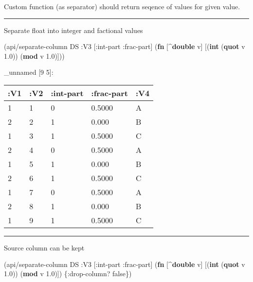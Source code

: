 \documentclass[]{article}
\newenvironment{Shaded}{\begin{snugshade}}{\end{snugshade}}
\newcommand{\KeywordTok}[1]{\textcolor[rgb]{0.13,0.29,0.53}{\textbf{#1}}}
\newcommand{\FloatTok}[1]{\textcolor[rgb]{0.00,0.00,0.81}{#1}}
\newcommand{\VariableTok}[1]{\textcolor[rgb]{0.00,0.00,0.00}{#1}}
\newcommand{\AttributeTok}[1]{\textcolor[rgb]{0.77,0.63,0.00}{#1}}
\newcommand{\NormalTok}[1]{#1}
\begin{document}
Custom function (as separator) should return seqence of values for given
value.

\begin{center}\rule{0.5\linewidth}{0.5pt}\end{center}

Separate float into integer and factional values

\begin{Shaded}
\begin{Highlighting}[]
\NormalTok{(api/separate-column DS }\AttributeTok{:V3}\NormalTok{ [}\AttributeTok{:int-part} \AttributeTok{:frac-part}\NormalTok{] (}\KeywordTok{fn}\NormalTok{ [^}\KeywordTok{double}\NormalTok{ v]}
\NormalTok{                                                     [(}\KeywordTok{int}\NormalTok{ (}\KeywordTok{quot}\NormalTok{ v }\FloatTok{1.0}\NormalTok{))}
\NormalTok{                                                      (}\KeywordTok{mod}\NormalTok{ v }\FloatTok{1.0}\NormalTok{)]))}
\end{Highlighting}
\end{Shaded}

\_unnamed {[}9 5{]}:

\begin{longtable}[]{@{}lllll@{}}
\toprule
:V1 & :V2 & :int-part & :frac-part & :V4\tabularnewline
\midrule
\endhead
1 & 1 & 0 & 0.5000 & A\tabularnewline
2 & 2 & 1 & 0.000 & B\tabularnewline
1 & 3 & 1 & 0.5000 & C\tabularnewline
2 & 4 & 0 & 0.5000 & A\tabularnewline
1 & 5 & 1 & 0.000 & B\tabularnewline
2 & 6 & 1 & 0.5000 & C\tabularnewline
1 & 7 & 0 & 0.5000 & A\tabularnewline
2 & 8 & 1 & 0.000 & B\tabularnewline
1 & 9 & 1 & 0.5000 & C\tabularnewline
\bottomrule
\end{longtable}

\begin{center}\rule{0.5\linewidth}{0.5pt}\end{center}

Source column can be kept

\begin{Shaded}
\begin{Highlighting}[]
\NormalTok{(api/separate-column DS }\AttributeTok{:V3}\NormalTok{ [}\AttributeTok{:int-part} \AttributeTok{:frac-part}\NormalTok{] (}\KeywordTok{fn}\NormalTok{ [^}\KeywordTok{double}\NormalTok{ v]}
\NormalTok{                                                     [(}\KeywordTok{int}\NormalTok{ (}\KeywordTok{quot}\NormalTok{ v }\FloatTok{1.0}\NormalTok{))}
\NormalTok{                                                      (}\KeywordTok{mod}\NormalTok{ v }\FloatTok{1.0}\NormalTok{)]) \{}\AttributeTok{:drop-column}\NormalTok{? }\VariableTok{false}\NormalTok{\})}
\end{Highlighting}
\end{Shaded}
\end{document}
